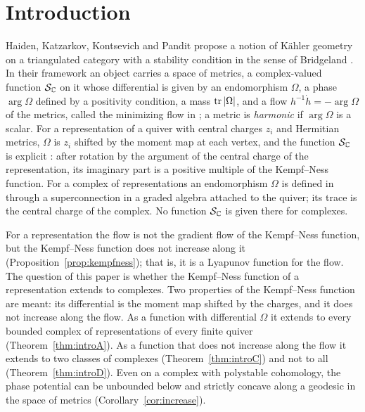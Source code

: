 \section{Introduction}\label{sec:intro}

Haiden, Katzarkov, Kontsevich and Pandit \cite{hkkp26} propose a notion of
K\"ahler geometry on a triangulated category with a stability condition in
the sense of Bridgeland \cite{bri07}. In their framework an object carries a
space of metrics, a complex-valued function $\mathcal S_{\mathbb C}$ on it whose
differential is given by an endomorphism $\Omega$, a phase $\arg\Omega$
defined by a positivity condition, a mass $\operatorname{tr}|\Omega|$, and a flow
$h^{-1}\dot h=-\arg\Omega$ of the metrics, called the minimizing flow in
\cite[\S4.1]{hkkp26}; a metric is \emph{harmonic} if $\arg\Omega$ is a
scalar. For a representation of a quiver with central charges $z_i$ and
Hermitian metrics, $\Omega$ is $z_i$ shifted by the moment map at each
vertex, and the function $\mathcal S_{\mathbb C}$ is explicit \cite[\S5.1]{hkkp26}: after
rotation by the argument of the central charge of the representation, its
imaginary part is a positive multiple of the Kempf--Ness function. For a
complex of representations an endomorphism $\Omega$ is defined in
\cite[\S5.4]{hkkp26} through a superconnection in a graded algebra attached
to the quiver; its trace is the central charge of the complex. No function
$\mathcal S_{\mathbb C}$ is given there for complexes.

For a representation the flow is not the gradient flow of the Kempf--Ness
function, but the Kempf--Ness function does not increase along it
(Proposition~\ref{prop:kempfness}); that is, it is a Lyapunov function for
the flow. The question of this paper is whether the Kempf--Ness function
of a representation extends to complexes. Two properties of the Kempf--Ness
function \cite{kn79,kin94} are meant: its differential is the moment map
shifted by the charges, and it does not increase along the flow. As a
function with differential $\Omega$ it extends to every bounded complex of
representations of every finite quiver (Theorem~\ref{thm:introA}). As a
function that does not increase along the flow it extends to two classes of
complexes (Theorem~\ref{thm:introC}) and not to all
(Theorem~\ref{thm:introD}). Even on a complex with polystable cohomology, the phase potential can be
unbounded below and strictly concave along a geodesic in the space of
metrics (Corollary~\ref{cor:increase}).

